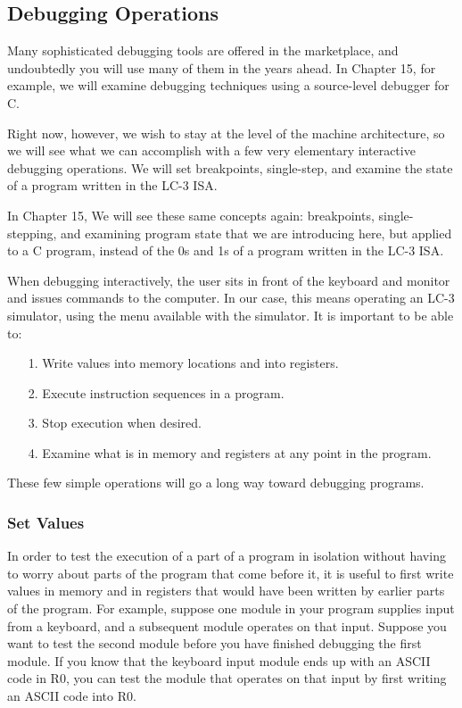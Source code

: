 \documentclass{patt}
\begin{document}
\subsection{Debugging Operations}

Many sophisticated debugging tools are offered in the
marketplace, and undoubtedly you will use many of them in the years
ahead.  In Chapter 15, for example, we will examine debugging techniques 
using a source-level debugger for C.  

Right now, however, we wish to stay at the level of the machine architecture, 
so we will see what we can accomplish with a few very elementary 
interactive debugging operations.  We will set breakpoints, single-step,
and examine the state of a program written in the LC-3 ISA.

In Chapter 15, We will see these same concepts again: breakpoints, 
single-stepping, and examining program state that we are introducing here,
but applied to a C program, instead of the 0s and 1s of a program written
in the LC-3 ISA.

When debugging interactively, the user sits in front of
the keyboard and monitor and issues commands to the computer.  In our
case, this means operating an LC-3 simulator, using the menu available
with the simulator.  It is important to be able to:

\begin{enumerate}
\item[1.]
Write values into memory locations and into registers.
\item[2.]
Execute instruction sequences in a program.
\item[3.]
Stop execution when desired.

\item[4.]
Examine what is in memory and registers at any point in the
program.
\end{enumerate}
These few simple operations will go a long way toward
debugging programs.

\subsubsection{Set Values}
In order to test the execution of a part of a program in isolation 
without having to worry about parts of the program that come before it,
it is useful to first write values in memory and in registers that would
have been written by earlier parts of the program.  For example,
suppose one module in your program supplies input from a keyboard, and a
subsequent module operates on that input.  Suppose you want to test the
second module before you have finished debugging the first module.  If
you know that the keyboard input module ends up with an ASCII code in
R0, you can test the module that operates on that input by first writing 
an ASCII code into R0.
\end{document}
